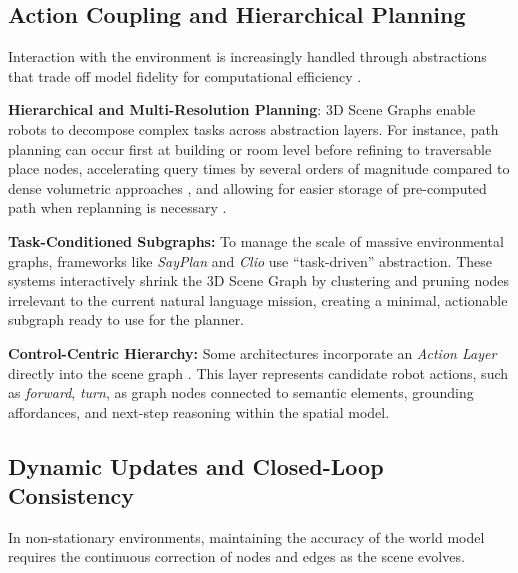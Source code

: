 \subsection{Action Coupling and Hierarchical Planning}\label{sec:querying_reasoning_action_action}
Interaction with the environment is increasingly handled through abstractions that trade off model fidelity for computational efficiency \cite{ejaz2025situationallyawarepathplanningexploiting}.

\noindent\textbf{Hierarchical and Multi-Resolution Planning}: 3D Scene Graphs enable robots to decompose complex tasks across abstraction layers.
For instance, path planning can occur first at building or room level before refining to traversable place nodes, accelerating query times by several orders of magnitude compared to dense volumetric approaches \cite{viswanathan2024xflieleveragingactionablehierarchical} \cite{viswanathan2025spadescalablepathplanning} \cite{ejaz2025situationallyawarepathplanningexploiting} \cite{ray2024taskmotionplanninghierarchical}, and allowing for easier storage of pre-computed path when replanning is necessary \cite{ejaz2025situationallyawarepathplanningexploiting}.

\noindent\textbf{Task-Conditioned Subgraphs:} To manage the scale of massive environmental graphs, frameworks like \textit{SayPlan}\cite{rana2023sayplangroundinglargelanguage} and \textit{Clio}\cite{maggio_clio_2024} use ``task-driven'' abstraction. 
These systems interactively shrink the 3D Scene Graph by clustering and pruning nodes irrelevant to the current natural language mission, creating a minimal, actionable subgraph ready to use for the planner.

\noindent\textbf{Control-Centric Hierarchy:} Some architectures incorporate an \textit{Action Layer} directly into the scene graph \cite{ravichandran_hierarchical_2021}. 
This layer represents candidate robot actions, such as \textit{forward}, \textit{turn}, as graph nodes connected to semantic elements, grounding affordances, and next-step reasoning within the spatial model.

\subsection{Dynamic Updates and Closed-Loop Consistency}\label{sec:querying_reasoning_action_updates}
In non-stationary environments, maintaining the accuracy of the world model requires the continuous correction of nodes and edges as the scene evolves. 

